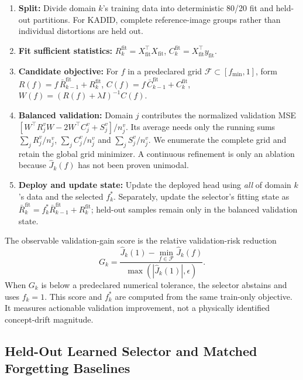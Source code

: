 \documentclass[10pt]{article}
\begin{document}
\begin{enumerate}
  \item \textbf{Split:} Divide domain $k$'s training data into deterministic
    80/20 fit and held-out partitions. For KADID, complete reference-image
    groups rather than individual distortions are held out.
  \item \textbf{Fit sufficient statistics:}
    $R^{\mathrm{fit}}_k = X_{\mathrm{fit}}^\top X_{\mathrm{fit}}$,
    $C^{\mathrm{fit}}_k = X_{\mathrm{fit}}^\top y_{\mathrm{fit}}$.
  \item \textbf{Candidate objective:} For $f$ in a predeclared grid
    $\mathcal F\subset[f_{\min},1]$, form
    $R(f) = f\,\bar R^{\mathrm{fit}}_{k-1} + R^{\mathrm{fit}}_k$,
    $C(f) = f\,\bar C^{\mathrm{fit}}_{k-1} + C^{\mathrm{fit}}_k$,
    $W(f) = (R(f)+\lambda I)^{-1} C(f)$.
  \item \textbf{Balanced validation:} Domain $j$ contributes the normalized
    validation MSE
    $[W^\top R_j^vW-2W^\top C_j^v+S_j^v]/n_j^v$.
    Its average needs only the running sums
    $\sum_jR_j^v/n_j^v$, $\sum_jC_j^v/n_j^v$ and
    $\sum_jS_j^v/n_j^v$.  We enumerate the complete grid and retain the
    global grid minimizer. A continuous refinement is only an ablation because
    $\hat J_k(f)$ has not been proven unimodal.
  \item \textbf{Deploy and update state:} Update the deployed head using
    \emph{all} of domain $k$'s data and the selected $f_k^*$. Separately,
    update the selector's fitting state as
    $\bar R_k^{\mathrm{fit}}=f_k^*\bar R_{k-1}^{\mathrm{fit}}+
    R_k^{\mathrm{fit}}$; held-out samples remain only in the balanced
    validation state.
\end{enumerate}

The observable validation-gain score is the relative validation-risk reduction
\begin{equation}
  G_k =
  \frac{\hat J_k(1)-\min_{f\in\mathcal F}\hat J_k(f)}
       {\max(|\hat J_k(1)|,\epsilon)}.
  \label{eq:validation_gain}
\end{equation}
When $G_k$ is below a predeclared numerical tolerance, the selector
abstains and uses $f_k=1$.  This score and $f_k^*$ are computed from the same
train-only objective. It measures actionable validation improvement, not a
physically identified concept-drift magnitude.

\subsection{Held-Out Learned Selector and Matched Forgetting Baselines}
\label{sec:selector-v2-method}
\end{document}
